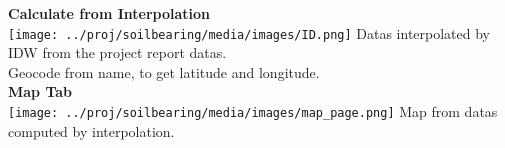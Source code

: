 \textbf{Calculate from Interpolation}\\
\texttt{[image: ../proj/soilbearing/media/images/ID.png]}
Datas interpolated by IDW from the project report datas.\\
Geocode from name, to get latitude and longitude.\\

\textbf{Map Tab}\\
\texttt{[image: ../proj/soilbearing/media/images/map\_page.png]}
Map from datas computed by interpolation.\\